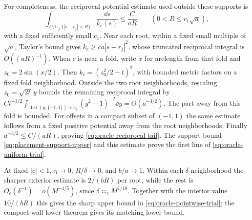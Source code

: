 For completeness, the reciprocal-potential estimate used outside
these supports is
\begin{equation}\label{eq:oracle-reciprocal-tail}
 \int_{\Gamma\setminus\cup_j\{|s-r_j|<R\}}\frac{\dd s}{k_c(s)}
 \le \frac{C}{aR}\qquad(0<R\le c_1\sqrt a),
\end{equation}
with a fixed sufficiently small $c_1$.
Near each root, within a fixed small multiple of $\sqrt a$, Taylor's
bound gives $k_c\ge c a|s-r_j|^2$, whose truncated reciprocal integral
is $O((aR)^{-1})$. When $c$ is near a fold, write $x$ for arclength
from that fold and $z_0=2\sin(x/2)$. Then
$k_c=(z_0^2/2-t)^2$, with bounded metric factors on a fixed fold
neighborhood. Outside the two root neighborhoods, rescaling
$z_0=\sqrt{2t}\,y$ bounds the remaining reciprocal integral by
$Ct^{-3/2}\int_{\operatorname{dist}(y,\{-1,1\})>c_2}
 (y^2-1)^{-2}\dd y=O(a^{-3/2})$.
The part away from this fold is bounded. For offsets in a compact
subset of $(-1,1)$ the same estimate follows from a fixed positive
potential away from the root neighborhoods. Finally
$a^{-3/2}\le C/(aR)$, proving \eqref{eq:oracle-reciprocal-tail}.
The support bound \eqref{eq:placement-support-upper} and this estimate
prove the first line of \eqref{eq:oracle-uniform-trial}.

At fixed $|c|<1$, $\eta\to0$, $R/\delta\to0$, and $b/a\to1$.
Within each $\delta$-neighborhood the sharper exterior estimate is
$2/(bR)$ per root, while the rest is $O_c(\delta^{-1})=o(M^{-1/5})$, since
$\delta\asymp_c M^{1/10}$.
Together with the interior value $10/(bR)$ this gives the sharp
upper bound in \eqref{eq:oracle-pointwise-trial}; the compact-wall
lower theorem gives its matching lower bound.

